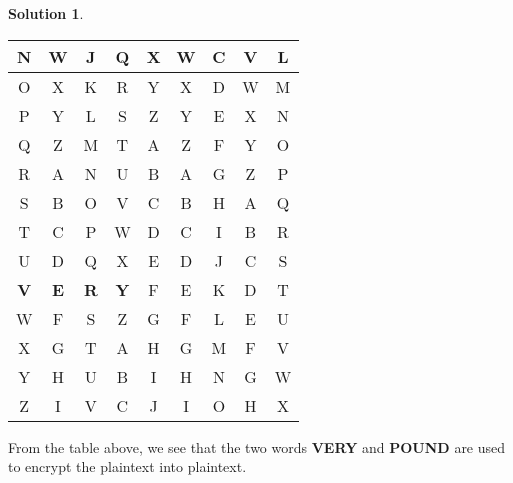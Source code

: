 \documentclass[11pt]{article}
\theoremstyle{definition}\newtheorem{definition}{Definition}
\theoremstyle{definition}\newtheorem{question}{Question}
\theoremstyle{definition}\newtheorem*{solution}{Solution}
\theoremstyle{definition}\newtheorem{example}{Example}
\theoremstyle{definition}\newtheorem{notation}{Notation}
\theoremstyle{theorem}\newtheorem{theorem}{Theorem}
\theoremstyle{theorem}\newtheorem{corollary}{Corollary}
\theoremstyle{theorem}\newtheorem{lemma}{Lemma}
\theoremstyle{theorem}\newtheorem{proposition}{Proposition}
\begin{document}
\begin{solution}
\begin{center}
\begin{tabular}{|c|c|c|c||c|c|c|c|c|}
            N & W & J & Q & X & W & C & V & L \\ \hline
            O & X & K & R & Y & X & D & W & M \\ \hline
            P & Y & L & S & Z & Y & E & X & N \\ \hline
            Q & Z & M & T & A & Z & F & Y & O \\ \hline
            R & A & N & U & B & A & G & Z & P \\ \hline
            S & B & O & V & C & B & H & A & Q \\ \hline
            T & C & P & W & D & C & I & B & R \\ \hline
            U & D & Q & X & E & D & J & C & S \\ \hline
            \textbf{V} & \textbf{E} & \textbf{R} & \textbf{Y} & F & E & K & D & T \\ \hline
            W & F & S & Z & G & F & L & E & U \\ \hline
            X & G & T & A & H & G & M & F & V \\ \hline
            Y & H & U & B & I & H & N & G & W \\ \hline
            Z & I & V & C & J & I & O & H & X \\ \hline
        \end{tabular}
    \end{center}
    From the table above, we see that the two words \textbf{VERY} and \textbf{POUND} are used to encrypt the plaintext into plaintext.
\end{solution}
\end{document}
